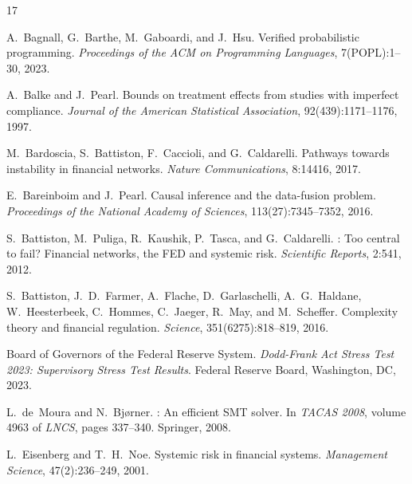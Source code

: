 \documentclass[11pt,a4paper]{article}
\begin{document}
\begin{thebibliography}{17}

A.~Bagnall, G.~Barthe, M.~Gaboardi, and J.~Hsu.
\newblock Verified probabilistic programming.
\newblock \emph{Proceedings of the ACM on Programming Languages}, 7(POPL):1--30, 2023.

A.~Balke and J.~Pearl.
\newblock Bounds on treatment effects from studies with imperfect compliance.
\newblock \emph{Journal of the American Statistical Association}, 92(439):1171--1176, 1997.

M.~Bardoscia, S.~Battiston, F.~Caccioli, and G.~Caldarelli.
\newblock Pathways towards instability in financial networks.
\newblock \emph{Nature Communications}, 8:14416, 2017.

E.~Bareinboim and J.~Pearl.
\newblock Causal inference and the data-fusion problem.
\newblock \emph{Proceedings of the National Academy of Sciences}, 113(27):7345--7352, 2016.

S.~Battiston, M.~Puliga, R.~Kaushik, P.~Tasca, and G.~Caldarelli.
: Too central to fail? {Financial} networks, the {FED} and systemic risk.
\newblock \emph{Scientific Reports}, 2:541, 2012.

S.~Battiston, J.~D.~Farmer, A.~Flache, D.~Garlaschelli, A.~G.~Haldane,
  W.~Heesterbeek, C.~Hommes, C.~Jaeger, R.~May, and M.~Scheffer.
\newblock Complexity theory and financial regulation.
\newblock \emph{Science}, 351(6275):818--819, 2016.

Board of Governors of the Federal Reserve System.
\newblock \emph{Dodd-Frank Act Stress Test 2023: Supervisory Stress Test Results}.
\newblock Federal Reserve Board, Washington, DC, 2023.

L.~de~Moura and N.~Bj{\o}rner.
: An efficient {SMT} solver.
\newblock In \emph{TACAS 2008}, volume 4963 of \emph{LNCS}, pages 337--340. Springer, 2008.

L.~Eisenberg and T.~H.~Noe.
\newblock Systemic risk in financial systems.
\newblock \emph{Management Science}, 47(2):236--249, 2001.


\end{thebibliography}
\end{document}
